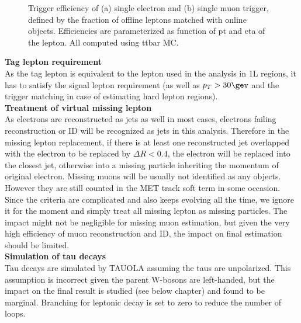 \begin{figure}[h]
  \centering
    \caption{Trigger efficiency of (a) single electron and (b) single muon trigger, defined by the fraction of offline leptons matched with online objects. Efficiencies are parameterized as function of pt and eta of the lepton. All computed using ttbar MC.  \label{fig::ObjReplace::method::SLTeff}}    
\end{figure}

\noindent \textbf{Tag lepton requirement} \\
As the tag lepton is equivalent to the lepton used in the analysis in 1L regions, it has to satisfy the signal lepton requirement (as well as $p_{T}>30\gev$ and the trigger matching in case of estimating hard lepton regions). \\

\noindent \textbf{Treatment of virtual missing lepton} \\
As electrons are reconstructed as jets as well in most cases, electrons failing reconstruction or ID will be recognized as jets in this analysis. Therefore in the missing lepton replacement, if there is at least one reconstructed jet overlapped with the electron to be replaced by $\Delta R<0.4$, the electron will be replaced into the closest jet, otherwise into a missing particle inheriting the momentum of original electron.
Missing muons will be usually not identified as any objects. However they are still counted in the MET track soft term in some occasion. Since the criteria are complicated and also keeps evolving all the time, we ignore it for the moment and simply treat all missing lepton as missing particles. The impact might not be negligible for missing muon estimation, but given the very high efficiency of muon reconstruction and ID, the impact on final estimation should be limited.  \\

\noindent \textbf{Simulation of tau decays} \\
Tau decays are simulated by TAUOLA \cite{rep::TAUOLA} assuming the taus are unpolarized. This assumption is incorrect given the parent W-bosons are left-handed, but the impact on the final result is studied (see below chapter) and found to be marginal. Branching for leptonic decay is set to zero to reduce the number of loops. \\

